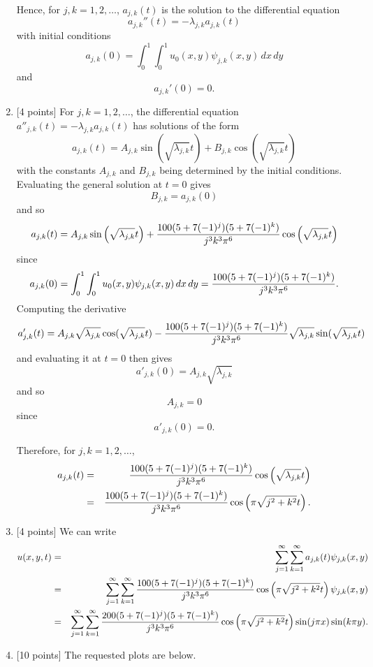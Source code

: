 \begin{solution}
\begin{enumerate}
Hence, for $j,k=1,2,\ldots$, $a_{j,k}(t)$ is the solution to the differential equation
\[
a_{j,k}''(t)=-\lambda_{j,k} a_{j,k}(t)
\]
with initial conditions
\[
a_{j,k}(0)=\int_0^1\int_0^1u_0(x,y)\psi_{j,k}(x,y)\,dx\,dy
\]
and
\[
a_{j,k}'(0)=0.
\]

\item {[4 points]} For $j,k=1,2,\ldots$, the differential equation $a''_{j,k}(t) = -\lambda_{j,k} a_{j,k}(t)$ has solutions of the form
\[
a_{j,k}(t) = A_{j,k}\sin\left(\sqrt{\lambda_{j,k}} t\right)+B_{j,k}\cos\left(\sqrt{\lambda_{j,k}} t\right)
\]
with the constants $A_{j,k}$ and $B_{j,k}$ being determined by the initial conditions. Evaluating the general solution at $t=0$ gives
\[
B_{j,k}=a_{j,k}(0)
\]
and so
\[
a_{j,k}(t) = A_{j,k}\sin\left(\sqrt{\lambda_{j,k}} t\right)+{100 (5+7(-1)^j)(5+7(-1)^k)\over j^3 k^3 \pi^6}\cos\left(\sqrt{\lambda_{j,k}} t\right)
\]
since
\[
a_{j,k}(0)=\int_0^1\int_0^1u_0(x,y)\psi_{j,k}(x,y)\,dx\,dy={100 (5+7(-1)^j)(5+7(-1)^k)\over j^3 k^3 \pi^6}.
\]
Computing the derivative
\[
a'_{j,k}(t) = A_{j,k}\sqrt{\lambda_{j,k}} \cos(\sqrt{\lambda_{j,k}} t) - {100 (5+7(-1)^j)(5+7(-1)^k)\over j^3 k^3 \pi^6}\sqrt{\lambda_{j,k}} \sin(\sqrt{\lambda_{j,k}} t)
\]
and evaluating it at $t=0$ then gives
\[
a'_{j,k}(0) = A_{j,k}\sqrt{\lambda_{j,k}}
\]
and so
\[
A_{j,k} = 0
\]
since
\[
a'_{j,k}(0) = 0.
\]

Therefore, for $j,k=1,2,\ldots$,
\begin{eqnarray*}
a_{j,k}(t)&=&{100 (5+7(-1)^j)(5+7(-1)^k)\over j^3 k^3 \pi^6}\cos\left(\sqrt{\lambda_{j,k}} t\right)
\\
&=&{100 (5+7(-1)^j)(5+7(-1)^k)\over j^3 k^3 \pi^6}\cos\left(\pi\sqrt{j^2+k^2} t\right).
\end{eqnarray*}

\item {[4 points]} We can write
\begin{eqnarray*}
u(x,y,t) &=& \sum_{j=1}^\infty \sum_{k=1}^\infty a_{j,k}(t) \psi_{j,k}(x,y)
\\
&=& \sum_{j=1}^\infty \sum_{k=1}^\infty {100 (5+7(-1)^j)(5+7(-1)^k)\over j^3 k^3 \pi^6}\cos\left(\pi\sqrt{j^2+k^2} t\right) \psi_{j,k}(x,y)
\\
&=& \sum_{j=1}^\infty \sum_{k=1}^\infty {200 (5+7(-1)^j)(5+7(-1)^k)\over j^3 k^3 \pi^6}\cos\left(\pi\sqrt{j^2+k^2} t\right) \sin(j\pi x)\sin(k\pi y).
\end{eqnarray*}

\item {[10 points]} The requested plots are below.


\end{enumerate}
\end{solution}
